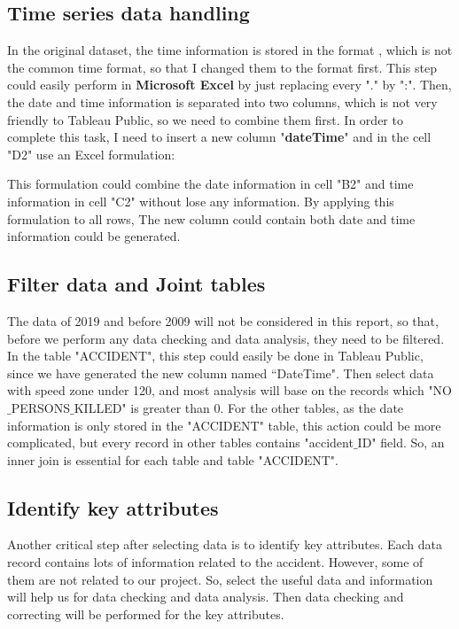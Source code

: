 \documentclass[10pt]{article}
\theoremstyle{definition}
\begin{document}
\subsection{Time series data handling}
In the original dataset, the time information is stored in the format , which is not the common time format, so that I changed them to the format  first. This step could easily perform in \textbf{Microsoft Excel} by just replacing every "." by ":". Then, the date and time information is separated into two columns, which is not very friendly to Tableau Public, so we need to combine them first. In order to complete this task, I need to insert a new column "\textbf{dateTime}" and in the cell "D2" use an Excel formulation:
\begin{center}
\end{center}
This formulation could combine the date information in cell "B2" and time information in cell "C2" without lose any information. By applying this formulation to all rows, The new column could contain both date and time information could be generated.\par

\subsection{Filter data and Joint tables}	
The data of 2019 and before 2009 will not be considered in this report, so that, before we perform any data checking and data analysis, they need to be filtered. In the table "ACCIDENT", this step could easily be done in Tableau Public, since we have generated the new column named “DateTime". Then select data with speed zone under 120, and most analysis will base on the records which "NO$\_$PERSONS$\_$KILLED" is greater than 0. For the other tables, as the date information is only stored in the "ACCIDENT" table, this action could be more complicated, but every record in other tables contains "accident$\_$ID" field. So, an inner join is essential for each table and table "ACCIDENT". \par

\subsection{Identify key attributes}
\label{IdentifyKeyAttributes}
Another critical step after selecting data is to identify key attributes. Each data record contains lots of information related to the accident. However, some of them are not related to our project. So, select the useful data and information will help us for data checking and data analysis. Then data checking and correcting will be performed for the key attributes.\par
\end{document}
